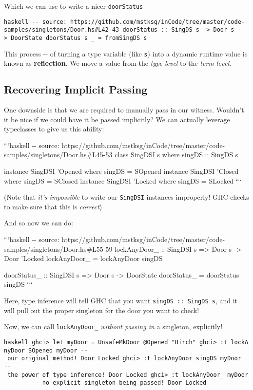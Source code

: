 \documentclass[]{article}
\begin{document}
Which we can use to write a nicer \texttt{doorStatus}

\texttt{haskell\ -\/-\ source:\ https://github.com/mstksg/inCode/tree/master/code-samples/singletons/Door.hs\#L42-43\ doorStatus\ ::\ SingDS\ s\ -\textgreater{}\ Door\ s\ -\textgreater{}\ DoorState\ doorStatus\ s\ \_\ =\ fromSingDS\ s}

This process -\/- of turning a type variable (like \texttt{s}) into a dynamic
runtime value is known as \textbf{reflection}. We move a value from the
\emph{type level} to the \emph{term level}.

\subsection{Recovering Implicit Passing}

One downside is that we are required to manually pass in our witness. Wouldn't
it be nice if we could have it be passed implicitly? We can actually leverage
typeclasses to give us this ability:

```haskell -\/- source:
https://github.com/mstksg/inCode/tree/master/code-samples/singletons/Door.hs\#L45-53
class SingDSI s where singDS :: SingDS s

instance SingDSI 'Opened where singDS = SOpened instance SingDSI 'Closed where
singDS = SClosed instance SingDSI 'Locked where singDS = SLocked ```

(Note that \emph{it's impossible} to write our \texttt{SingDSI} instances
improperly! GHC checks to make sure that this is \emph{correct})

And so now we can do:

```haskell -\/- source:
https://github.com/mstksg/inCode/tree/master/code-samples/singletons/Door.hs\#L55-59
lockAnyDoor\_ :: SingDSI s =\textgreater{} Door s -\textgreater{} Door 'Locked
lockAnyDoor\_ = lockAnyDoor singDS

doorStatus\_ :: SingDSI s =\textgreater{} Door s -\textgreater{} DoorState
doorStatus\_ = doorStatus singDS ```

Here, type inference will tell GHC that you want \texttt{singDS\ ::\ SingDS\ s},
and it will pull out the proper singleton for the door you want to check!

Now, we can call \texttt{lockAnyDoor\_} \emph{without passing in} a singleton,
explicitly!

\texttt{haskell\ ghci\textgreater{}\ let\ myDoor\ =\ UnsafeMkDoor\ @\textquotesingle{}Opened\ "Birch"\ ghci\textgreater{}\ :t\ lockAnyDoor\ SOpened\ myDoor\ -\/-\ our\ original\ method!\ Door\ \textquotesingle{}Locked\ ghci\textgreater{}\ :t\ lockAnyDoor\ singDS\ myDoor\ \ -\/-\ the\ power\ of\ type\ inference!\ Door\ \textquotesingle{}Locked\ ghci\textgreater{}\ :t\ lockAnyDoor\_\ myDoor\ \ \ \ \ \ \ \ -\/-\ no\ explicit\ singleton\ being\ passed!\ Door\ \textquotesingle{}Locked}
\end{document}
